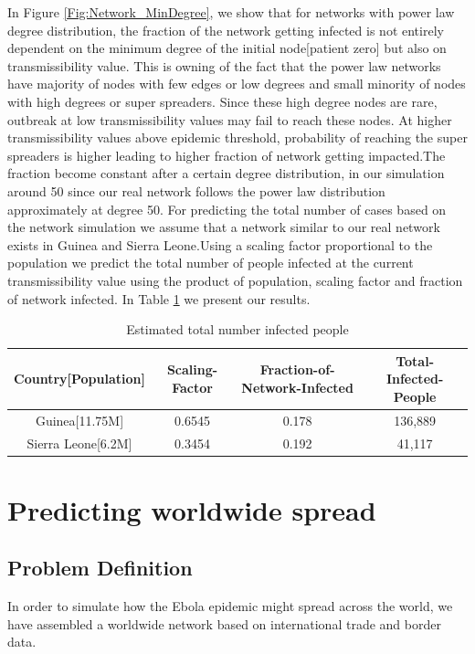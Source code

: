 \documentclass[10pt, journal,onecolumn]{IEEEtran}
\begin{document}
In Figure \ref{Fig:Network_MinDegree}, we show that  for networks with power law degree
distribution, the fraction of the network getting infected is not
entirely dependent on the minimum degree of the  initial node[patient zero] but also on
transmissibility value. This is owning of the fact that the power law networks have majority  of
nodes with few edges or low degrees and small minority of nodes with high degrees or super
spreaders. Since these high degree nodes are rare, outbreak at low transmissibility values  may fail
to reach these nodes. At higher transmissibility values above epidemic threshold, probability of
reaching the super spreaders is higher leading to higher fraction of network getting impacted.The
fraction become constant after a certain degree distribution, in our simulation around 50 since our
real network follows the power law distribution approximately at degree 50. For predicting the total
number of cases based on the network simulation we assume that a  network similar to our real
network exists in Guinea and Sierra Leone.Using a scaling factor proportional to the population we
predict the total number of people infected at the current transmissibility value using the product
of population, scaling factor and fraction of network infected.
In Table \ref{Tb:prediction_networkm} we present our results. \begin{table}[h]
\caption{Estimated total number infected people}
\centering
\begin{tabular}{|c|c|c|c|}
\hline
Country[Population] & Scaling-Factor & Fraction-of-Network-Infected & Total-Infected-People
\tabularnewline
\hline
\hline
Guinea[11.75M] & 0.6545 & 0.178 & 136,889\tabularnewline
\hline
Sierra Leone[6.2M] & 0.3454 & 0.192 & 41,117\tabularnewline
\hline
\end{tabular}
\label{Tb:prediction_networkm}

\end{table}





\section{Predicting worldwide spread}
\label{sec:Worldwide}

\subsection{{Problem Definition}}

In order to simulate how the Ebola epidemic might spread across the world, we have assembled a
worldwide network based on international trade and border data.
\end{document}
